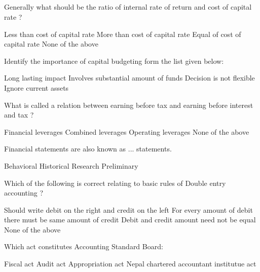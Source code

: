 \subsection*{}
\begin{questions}

\question Generally what should be the ratio of internal rate of return and cost of capital rate ?
  \begin{choices}
  \choice Less than cost of capital rate
  \choice More than cost of capital rate
  \choice Equal of cost of capital rate
  \choice None of the above
  \end{choices}

\question Identify the importance of capital budgeting form the list given below:
  \begin{choices}
  \choice Long lasting impact
  \choice Involves substantial amount of funds
  \choice Decision is not flexible
  \choice Ignore current assets
  \end{choices}

\question What is called a relation between earning before tax and earning before interest and tax ?
  \begin{choices}
  \choice Financial leverages
  \choice Combined leverages
  \choice Operating leverages
  \choice None of the above
  \end{choices}

\question Financial statements are also known as ... statements.
  \begin{choices}
  \choice Behavioral
  \choice Historical
  \choice Research
  \choice Preliminary
  \end{choices}

\question Which of the following is correct relating to basic rules of Double entry accounting ?
  \begin{choices}
  \choice Should write debit on the right and credit on the left
  \choice For every amount of debit there must be same amount of credit
  \choice Debit and credit amount need not be equal
  \choice None of the above
  \end{choices}

\question Which act constitutes Accounting Standard Board:
  \begin{choices}
  \choice Fiscal act
  \choice Audit act
  \choice Appropriation act
  \choice Nepal chartered accountant institutue act
  \end{choices}


\end{questions}
